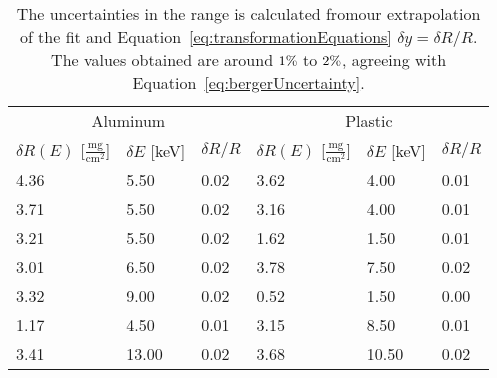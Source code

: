 \begin{table}[h] 
   \begin{center} 
      \begin{tabular}{llllll}\toprule 
\multicolumn{3}{c}{Aluminum} & \multicolumn{3}{c}{Plastic}\\ 
\cmidrule(r){1-3} 
\cmidrule(r){4-6} 
$\delta R(E)$ [$\frac{\text{mg}}{\text{cm}^2}$]& $\delta E$ [keV]& $\delta R/R$ &$\delta R(E)$ [$\frac{\text{mg}}{\text{cm}^2}$]& $\delta E$ [keV]& $\delta R/R$\\ \midrule 
    4.36 &     5.50 &     0.02 &     3.62 &     4.00 &     0.01 \\ 
    3.71 &     5.50 &     0.02 &     3.16 &     4.00 &     0.01 \\ 
    3.21 &     5.50 &     0.02 &     1.62 &     1.50 &     0.01 \\ 
    3.01 &     6.50 &     0.02 &     3.78 &     7.50 &     0.02 \\ 
    3.32 &     9.00 &     0.02 &     0.52 &     1.50 &     0.00 \\ 
    1.17 &     4.50 &     0.01 &     3.15 &     8.50 &     0.01 \\ 
    3.41 &    13.00 &     0.02 &     3.68 &    10.50 &     0.02 \\ \bottomrule 
      \end{tabular} 
   \end{center}
\caption{The uncertainties in the range is calculated fromour extrapolation of the fit and Equation~\eqref{eq:transformationEquations} $\delta y = \delta R/R$. The values obtained are around $1\%~$to$~2\%$, agreeing with Equation~\eqref{eq:bergerUncertainty}. } 
\label{tab:uncertaintyConversion} 
\end{table} 

